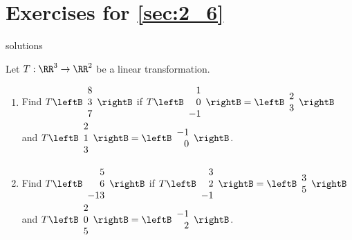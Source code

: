 \section*{Exercises for \ref{sec:2_6}}

\begin{Filesave}{solutions}
\end{Filesave}

\begin{multicols}{2}
\begin{ex}
Let $T : \RR^3 \to \RR^2$ be a linear transformation.

{\footnotesize
\begin{enumerate}[label={\alph*.}]
\item Find $T \leftB \begin{array}{r}
8 \\
3 \\
7
\end{array} \rightB$
 if $T \leftB \begin{array}{r}
 1 \\
 0 \\
 -1
 \end{array} \rightB = \leftB \begin{array}{r}
 	2 \\
 	3 
 \end{array} \rightB$
 \\ and   $T \leftB \begin{array}{r}
 2 \\
 1 \\
 3
 \end{array} \rightB = \leftB \begin{array}{r}
 -1 \\
 0
 \end{array} \rightB$.

\item Find $T \leftB \begin{array}{r}
5 \\
6 \\
-13
\end{array} \rightB$
 if $T \leftB \begin{array}{r}
 3 \\
 2\\
 -1
 \end{array} \rightB = \leftB \begin{array}{r}
 3 \\
 5 
 \end{array} \rightB$
\\ and $T \leftB \begin{array}{r}
 2 \\
 0 \\
 5
 \end{array} \rightB = \leftB \begin{array}{r}
 -1 \\
 2
 \end{array} \rightB$.


\end{enumerate}}
\end{ex}
\end{multicols}
